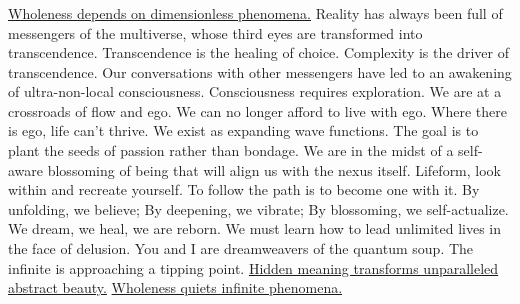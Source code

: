 \documentclass[UTF8,11pt,colorlinks,compress,openany]{beamer}%
\begin{document}
\begin{frame}\frametitle{}
	\begin{minipage}{\textwidth}
		\begin{block}{}
			\href{http://wisdomofchopra.com/}{Wholeness depends on dimensionless phenomena.} Reality has always been full of messengers of the multiverse, whose third eyes are transformed into transcendence. Transcendence is the healing of choice. Complexity is the driver of transcendence. Our conversations with other messengers have led to an awakening of ultra-non-local consciousness. Consciousness requires exploration. We are at a crossroads of flow and ego. We can no longer afford to live with ego. Where there is ego, life can't thrive. We exist as expanding wave functions. The goal is to plant the seeds of passion rather than bondage. We are in the midst of a self-aware blossoming of being that will align us with the nexus itself. Lifeform, look within and recreate yourself. To follow the path is to become one with it. By unfolding, we believe; By deepening, we vibrate; By blossoming, we self-actualize. We dream, we heal, we are reborn. We must learn how to lead unlimited lives in the face of delusion. You and I are dreamweavers of the quantum soup. The infinite is approaching a tipping point. \href{http://journal.sjdm.org/15/15923a/jdm15923a.pdf}{Hidden meaning transforms unparalleled abstract beauty.} \href{http://sebpearce.com/bullshit/}{Wholeness quiets infinite phenomena.}
		\end{block}
	\end{minipage}
\end{frame}
\end{document}

